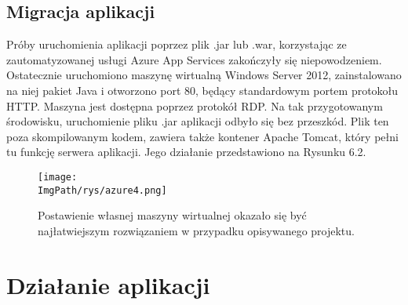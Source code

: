 \documentclass[a4paper,12pt,twoside,openany]{report}
\newcommand{\ImgPath}{.}
\begin{document}
\section{Migracja aplikacji}
Próby uruchomienia aplikacji poprzez plik .jar lub .war, korzystając ze zautomatyzowanej usługi Azure App Services zakończyły się niepowodzeniem. Ostatecznie uruchomiono maszynę wirtualną Windows Server 2012, zainstalowano na niej pakiet Java i otworzono port 80, będący standardowym portem protokołu HTTP. Maszyna jest dostępna poprzez protokół RDP. Na tak przygotowanym środowisku, uruchomienie pliku .jar aplikacji odbyło się bez przeszkód. Plik ten poza skompilowanym kodem, zawiera także kontener Apache Tomcat, który pełni tu funkcję serwera aplikacji. Jego działanie przedstawiono na Rysunku 6.2.
				\begin{figure}[!htbp]
					\begin{center}
						\centering
						\texttt{[image: \\ImgPath/rys/azure4.png]}
					\end{center}
					\caption{Postawienie własnej maszyny wirtualnej okazało się być najłatwiejszym rozwiązaniem w przypadku opisywanego projektu.}
					\label{UMLTS}
				\end{figure}
\chapter{Działanie aplikacji}
\end{document}
